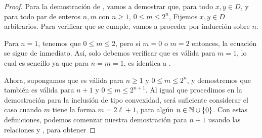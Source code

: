 \begin{proof}
	Para la demostraci\'on de , vamos a demostrar que, para todo $x,y\in D$,
	y para todo par de enteros $n,m$ con $n\geq 1$, $0\leq m\leq 2^n$,
	Fijemos $x,y\in D$ arbitrarios. Para verificar que  se cumple,
	vamos a proceder por inducci\'on sobre $n$. 
	
	Para $n=1$, tenemos que $0\leq m\leq 2$, pero si $m=0$ o $m=2$ entonces, 
	la ecuaci\'on  se sigue de inmediato. As\'i, solo debemos verificar
	que  es v\'alida para $m=1$, lo cual es sencillo ya que para 
	$n=m=1$,  es identica a . 
	
	Ahora, supongamos que  es v\'alida para $n\geq1$ y $0\leq m \leq 2^n$,
	y demostremos que tambi\'en es v\'alida para $n+1$ y $0\leq m\leq 2^{n+1}$.
	Al igual que procedimos en la demostraci\'on para la inclusi\'on de tipo 
	convexidad, ser\'a suficiente considerar el caso cuando $m$ tiene la forma
	$m = 2\ell + 1$, para alg\'un $n\in\mathbb{N}\cup\{0\}$. Con estas definiciones, 
	podemos comenzar nuestra demostraci\'on para $n+1$ usando las relaciones 
	 y , para obtener
	
	

\end{proof}
